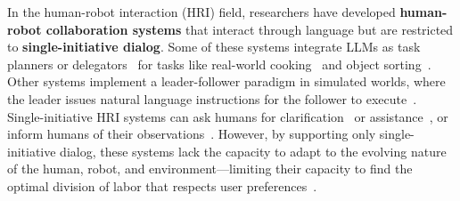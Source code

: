 In the human-robot interaction (HRI) field, researchers have developed \textbf{human-robot collaboration systems} that interact through language but are restricted to \textbf{single-initiative dialog}.
Some of these systems integrate LLMs as task planners or delegators~\cite{wang2024mosaicmodularassistiveinteractive, mandi2023rocodialecticmultirobotcollaboration, feng2024largelanguagemodelbasedhumanagent} for tasks like real-world cooking~\cite{wang2024mosaicmodularassistiveinteractive} and object sorting~\cite{mandi2023rocodialecticmultirobotcollaboration}.
Other systems implement a leader-follower paradigm in simulated worlds, where the leader issues natural language instructions for the follower to execute~\cite{suhr2022executinginstructionssituatedcollaborative, kojima2021continuallearninggroundedinstruction, deepmindinteractiveagentsteam2022creatingmultimodalinteractiveagents, gao2023alexaarenausercentricinteractive}.
Single-initiative HRI systems can ask humans for clarification~\cite{ren2023robotsaskhelpuncertainty} or assistance~\cite{bennetot2020artificialagentsaskhelp,6630673, 10.5555/2832747.2832901}, or inform humans of their observations~\cite{chen:jair10, 4115652, cascianelli2018full}. 
However, by supporting only single-initiative dialog, these systems lack the capacity to adapt to the evolving nature of the human, robot, and environment—limiting their capacity to find the optimal division of labor that respects user preferences~\cite{mandi2023rocodialecticmultirobotcollaboration}. 

